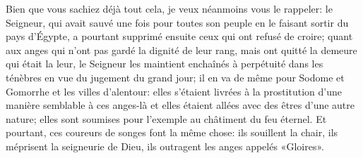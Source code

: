 Bien que vous sachiez déjà tout cela, je veux néanmoins vous le rappeler:
	le Seigneur, qui avait sauvé une fois pour toutes son peuple
		en le faisant sortir du pays d’Égypte,
	a pourtant supprimé ensuite ceux qui ont refusé de croire;
	quant aux anges qui n’ont pas gardé la dignité de leur rang,
	mais ont quitté la demeure qui était la leur,
	le Seigneur les maintient enchaînés à perpétuité dans les ténèbres
		en vue du jugement du grand jour;
	il en va de même pour Sodome et Gomorrhe et les villes d’alentour:
	elles s’étaient livrées à la prostitution d’une manière semblable à ces anges-là
	et elles étaient allées avec des êtres d’une autre nature;
	elles sont soumises pour l’exemple au châtiment du feu éternel.
Et pourtant, ces coureurs de songes font la même chose:
	ils souillent la chair, ils méprisent la seigneurie de Dieu,
	ils outragent les anges appelés «Gloires».
